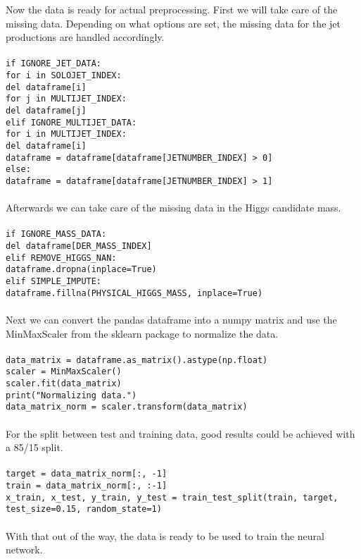 Now the data is ready for actual preprocessing.
First we will take care of the missing data.
Depending on what options are set, the missing data for the jet productions are handled accordingly.
\\
\\
\noindent\texttt{if IGNORE\_JET\_DATA:\\
\indent for i in SOLOJET\_INDEX:\\
\indent\indent del dataframe[i]\\
\indent for j in MULTIJET\_INDEX:\\
\indent\indent del dataframe[j]\\
elif IGNORE\_MULTIJET\_DATA:\\
\indent for i in MULTIJET\_INDEX:\\
\indent\indent del dataframe[i]\\
\indent dataframe = dataframe[dataframe[JETNUMBER\_INDEX] > 0]\\
else:\\
\indent dataframe = dataframe[dataframe[JETNUMBER\_INDEX] > 1]}
\\
\\
Afterwards we can take care of the missing data in the Higgs candidate mass.
\\
\\
\texttt{if IGNORE\_MASS\_DATA:\\
\indent del dataframe[DER\_MASS\_INDEX]\\
elif REMOVE\_HIGGS\_NAN:\\
\indent dataframe.dropna(inplace=True)\\
elif SIMPLE\_IMPUTE:\\
\indent dataframe.fillna(PHYSICAL\_HIGGS\_MASS, inplace=True)}
\\
\\
Next we can convert the pandas dataframe into a numpy matrix and use the MinMaxScaler from the sklearn package to normalize the data.
\\
\\
\texttt{data\_matrix = dataframe.as\_matrix().astype(np.float)\\
scaler = MinMaxScaler()\\
scaler.fit(data\_matrix)\\
print("Normalizing data.")\\
data\_matrix\_norm = scaler.transform(data\_matrix)}
\\
\\
For the split between test and training data, good results could be achieved with a 85/15 split.
\\
\\
\texttt{target = data\_matrix\_norm[:, -1]\\
train = data\_matrix\_norm[:, :-1]\\
x\_train, x\_test, y\_train, y\_test = train\_test\_split(train, target,\\
\indent test\_size=0.15, random\_state=1)}
\\
\\
With that out of the way, the data is ready to be used to train the neural network.

